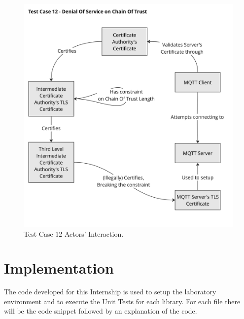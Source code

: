 \documentclass[binding=0.6cm,noexaminfo]{sapthesis}
\begin{document}
\begin{figure}[htb]
	\includegraphics[width=14cm]{TC12}
	\caption{Test Case 12 Actors' Interaction.}
	\label{fig:tc12}
\end{figure}

\chapter{Implementation}
The code developed for this Internship is used to setup the laboratory environment and to execute the Unit Tests for each library. For each file there will be the code snippet followed by an explanation of the code.
\end{document}
